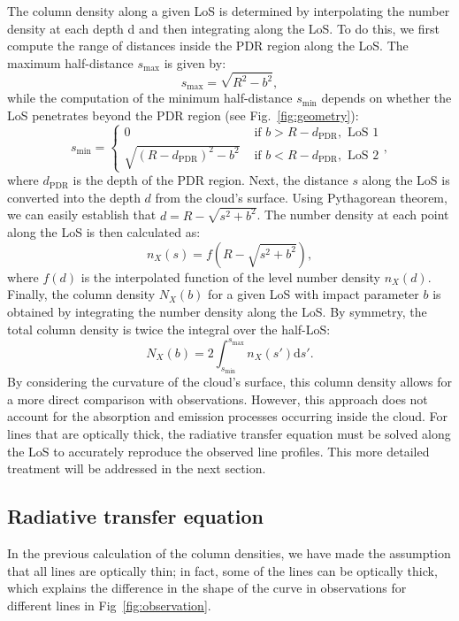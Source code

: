 \documentclass[12pt,a4paper]{article}
\newcommand{\mr}{\mathrm}
\newcommand{\dd}[1]{\mathrm{d}#1}
\begin{document}
The column density along a given LoS is determined by interpolating the number density at each depth d and then integrating along the LoS. To do this, we first compute the range of distances inside the PDR region along the LoS. The maximum half-distance $s_{\max}$ is given by:
\begin{equation}
    s_{\max} = \sqrt{R^2 - b^2},
\end{equation}
while the computation of the minimum half-distance $s_{\min}$ depends on whether the LoS penetrates beyond the PDR region (see Fig.~\ref{fig:geometry}):
\begin{equation}
    s_{\min} = \left\{\begin{array}{ll}
       0  &  \text{ if } b > R - d_\mr{PDR}, \text{ LoS 1} \\
       \sqrt{(R - d_\mr{PDR})^2 - b^2}  &  \text{ if } b < R - d_\mr{PDR}, \text{ LoS 2}
    \end{array}\right.,
\end{equation}
where $d_\mr{PDR}$ is the depth of the PDR region. Next, the distance $s$ along the LoS is converted into the depth $d$ from the cloud's surface. Using Pythagorean theorem, we can easily establish that $d = R - \sqrt{s^2 + b^2}$. The number density at each point along the LoS is then calculated as:
\begin{equation}
    n_X(s) = f(R - \sqrt{s^2 + b^2}),
\end{equation}
where $f(d)$ is the interpolated function of the level number density $n_X(d)$. Finally, the column density $N_X(b)$ for a given LoS with impact parameter $b$ is obtained by integrating the number density along the LoS. By symmetry, the total column density is twice the integral over the half-LoS: 
\begin{equation}
    N_X(b) = 2\int_{s_{\min}}^{s_{\max}} n_X(s') \dd{s'}.
\end{equation}
By considering the curvature of the cloud's surface, this column density allows for a more direct comparison with observations. However, this approach does not account for the absorption and emission processes occurring inside the cloud. For lines that are optically thick, the radiative transfer equation must be solved along the LoS to accurately reproduce the observed line profiles. This more detailed treatment will be addressed in the next section.

\subsection{Radiative transfer equation}
In the previous calculation of the column densities, we have made the assumption that all lines are optically thin; in fact, some of the lines can be optically thick, which explains the difference in the shape of the curve in observations for different lines in Fig~\ref{fig:observation}.
\end{document}
